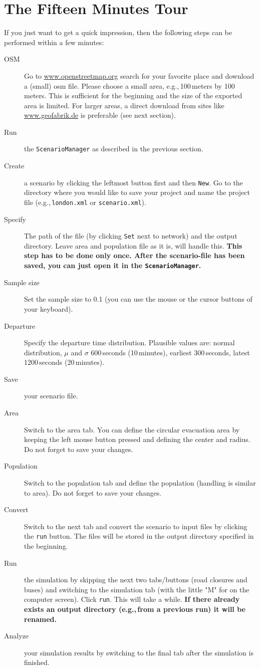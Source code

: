 \section{The Fifteen Minutes Tour}
\label{evac:section:fifteenminute}
If you just want to get a quick impression, then the following steps can be performed within a few minutes:
\begin{description}
\item[OSM] Go to \url{www.openstreetmap.org} search for your favorite place and download a (small) \gls{osm} file. Please choose a small area, e.g.,\,100\,meters by 100\,meters. This is sufficient for the beginning and the size of the exported area is limited. For larger areas, a direct download from sites like \url{www.geofabrik.de} is preferable (see next section).
\item[Run] the \lstinline|ScenarioManager| as described in the previous section.
\item[Create] a scenario by clicking the leftmost button first and then \lstinline|New|. Go to the directory where you would like to save your project and name the project file (e.g.,\,\lstinline|london.xml| or \lstinline|scenario.xml|).
\item[Specify] The path of the  file (by clicking \lstinline|Set| next to network) and the output directory. Leave area and population file as it is,  will handle this.
\textbf{This step has to be done only once. After the scenario-file has been saved, you can just open it in the \lstinline|ScenarioManager|.}
\item[Sample size] Set the sample size to 0.1 (you can use the mouse or the cursor buttons of your keyboard).
\item[Departure] Specify the departure time distribution. Plausible values are: normal distribution, $\mu$ and $\sigma$ 600\,seconds (10\,minutes), earliest 300\,seconds, latest 1200\,seconds (20\,minutes).
\item[Save] your scenario file.
\item[Area] Switch to the area tab. You can define the circular evacuation area by keeping the left mouse button pressed and defining the center and radius. Do not forget to save your changes.
\item[Population] Switch to the population tab and define the population (handling is similar to area). Do not forget to save your changes.
\item[Convert] Switch to the next tab and convert the scenario to  input files by clicking the \lstinline|run| button. The  files will be stored in the output directory specified in the beginning.
\item[Run] the  simulation by skipping the next two tabs/buttons (road closures and buses) and switching to the simulation tab (with the little "M" for  on the computer screen). Click \lstinline|run|. This will take a while.
\textbf{If there already exists an output directory (e.g.,\,from a previous run) it will be renamed.}
\item[Analyze] your simulation results by switching to the final tab after the simulation is finished.


\end{description}
